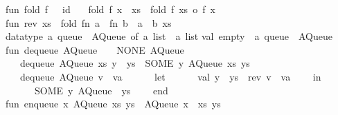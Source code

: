 \begin{isabellebody}
\begin{isamarkuptext}
fun\ fold\ f\ {\isacharbrackleft}{\isacharbrackright}\ {\isacharequal}\ id\isanewline
\ \ {\isacharbar}\ fold\ f\ {\isacharparenleft}x\ {\isacharcolon}{\isacharcolon}\ xs{\isacharparenright}\ {\isacharequal}\ fold\ f\ xs\ o\ f\ x{\isacharsemicolon}\isanewline
\isanewline
fun\ rev\ xs\ {\isacharequal}\ fold\ {\isacharparenleft}fn\ a\ {\isacharequal}{\isachargreater}\ fn\ b\ {\isacharequal}{\isachargreater}\ a\ {\isacharcolon}{\isacharcolon}\ b{\isacharparenright}\ xs\ {\isacharbrackleft}{\isacharbrackright}{\isacharsemicolon}\isanewline
\isanewline
datatype\ {\isacharprime}a\ queue\ {\isacharequal}\ AQueue\ of\ {\isacharprime}a\ list\ {\isacharasterisk}\ {\isacharprime}a\ list{\isacharsemicolon}\isanewline
\isanewline
val\ empty\ {\isacharcolon}\ {\isacharprime}a\ queue\ {\isacharequal}\ AQueue\ {\isacharparenleft}{\isacharbrackleft}{\isacharbrackright}{\isacharcomma}\ {\isacharbrackleft}{\isacharbrackright}{\isacharparenright}{\isacharsemicolon}\isanewline
\isanewline
fun\ dequeue\ {\isacharparenleft}AQueue\ {\isacharparenleft}{\isacharbrackleft}{\isacharbrackright}{\isacharcomma}\ {\isacharbrackleft}{\isacharbrackright}{\isacharparenright}{\isacharparenright}\ {\isacharequal}\ {\isacharparenleft}NONE{\isacharcomma}\ AQueue\ {\isacharparenleft}{\isacharbrackleft}{\isacharbrackright}{\isacharcomma}\ {\isacharbrackleft}{\isacharbrackright}{\isacharparenright}{\isacharparenright}\isanewline
\ \ {\isacharbar}\ dequeue\ {\isacharparenleft}AQueue\ {\isacharparenleft}xs{\isacharcomma}\ y\ {\isacharcolon}{\isacharcolon}\ ys{\isacharparenright}{\isacharparenright}\ {\isacharequal}\ {\isacharparenleft}SOME\ y{\isacharcomma}\ AQueue\ {\isacharparenleft}xs{\isacharcomma}\ ys{\isacharparenright}{\isacharparenright}\isanewline
\ \ {\isacharbar}\ dequeue\ {\isacharparenleft}AQueue\ {\isacharparenleft}v\ {\isacharcolon}{\isacharcolon}\ va{\isacharcomma}\ {\isacharbrackleft}{\isacharbrackright}{\isacharparenright}{\isacharparenright}\ {\isacharequal}\isanewline
\ \ \ \ let\isanewline
\ \ \ \ \ \ val\ y\ {\isacharcolon}{\isacharcolon}\ ys\ {\isacharequal}\ rev\ {\isacharparenleft}v\ {\isacharcolon}{\isacharcolon}\ va{\isacharparenright}{\isacharsemicolon}\isanewline
\ \ \ \ in\isanewline
\ \ \ \ \ \ {\isacharparenleft}SOME\ y{\isacharcomma}\ AQueue\ {\isacharparenleft}{\isacharbrackleft}{\isacharbrackright}{\isacharcomma}\ ys{\isacharparenright}{\isacharparenright}\isanewline
\ \ \ \ end{\isacharsemicolon}\isanewline
\isanewline
fun\ enqueue\ x\ {\isacharparenleft}AQueue\ {\isacharparenleft}xs{\isacharcomma}\ ys{\isacharparenright}{\isacharparenright}\ {\isacharequal}\ AQueue\ {\isacharparenleft}x\ {\isacharcolon}{\isacharcolon}\ xs{\isacharcomma}\ ys{\isacharparenright}{\isacharsemicolon}\isanewline

\end{isamarkuptext}
\end{isabellebody}
